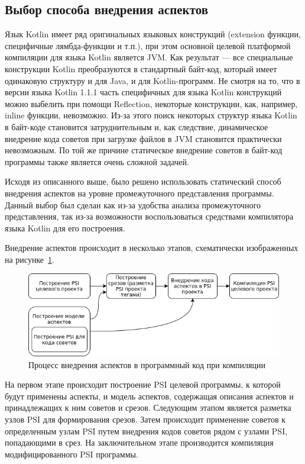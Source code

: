 \subsection{Выбор способа внедрения аспектов}
\label{sub:weaving_choise}
Язык Kotlin имеет ряд оригинальных языковых конструкций (extension функции,
специфичные лямбда-функции и т.п.), при этом основной целевой платформой
компиляции для языка Kotlin является JVM.
Как результат --- все специальные конструкции Kotlin преобразуются в стандартный
байт-код, который имеет одинаковую структуру и для Java, и для Kotlin-программ.
Не смотря на то, что в версии языка Kotlin 1.1.1 часть специфичных для языка
Kotlin конструкций можно выбелить при помощи Reflection, некоторые конструкции,
как, например, inline функции, невозможно.
Из-за этого поиск некоторых структур языка Kotlin в байт-коде становится
затруднительным и, как следствие, динамическое внедрение кода советов при
загрузке файлов в JVM становится практически невозможным.
По той же причине статическое внедрение советов в байт-код программы также
является очень сложной задачей.

Исходя из описанного выше, было решено использовать статический способ внедрения аспектов на уровне промежуточного представления программы.
Данный выбор был сделан как из-за удобства анализа промежуточного представления, так из-за возможности воспользоваться средствами компилятора языка Kotlin для его построения.

Внедрение аспектов происходит в несколько этапов, схематически изображенных на
рисунке~\ref{fig:aspect_weaving}.
\begin{figure}[!h]
\centering
\includegraphics[width=1\textwidth]{fig/aspect_weaving}
\caption{Процесс внедрения аспектов в программный код при компиляции}
\label{fig:aspect_weaving}
\end{figure}

На первом этапе происходит построение PSI целевой программы, к которой будут применены аспекты, и модель аспектов, содержащая описания аспектов и принадлежащих к ним советов и срезов.
Следующим этапом является разметка узлов PSI для формирования срезов.
Затем происходит применение советов к определенным узлам PSI путем внедрения кодов советов рядом с узлами PSI, попадающими в срез.
На заключительном этапе производится компиляция модифицированного PSI программы.

